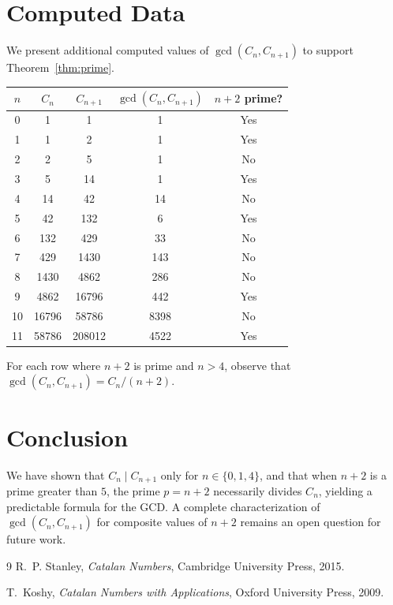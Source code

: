 \documentclass[12pt]{article}
\theoremstyle{definition}
\theoremstyle{remark}
\begin{document}
\section{Computed Data}

We present additional computed values of $\gcd(C_n, C_{n+1})$ to support Theorem~\ref{thm:prime}.

\begin{center}
\begin{tabular}{c|c|c|c|c}
$n$ & $C_n$ & $C_{n+1}$ & $\gcd(C_n, C_{n+1})$ & $n+2$ prime? \\
\hline
0 & 1 & 1 & 1 & Yes \\
1 & 1 & 2 & 1 & Yes \\
2 & 2 & 5 & 1 & No \\
3 & 5 & 14 & 1 & Yes \\
4 & 14 & 42 & 14 & No \\
5 & 42 & 132 & 6 & Yes \\
6 & 132 & 429 & 33 & No \\
7 & 429 & 1430 & 143 & No \\
8 & 1430 & 4862 & 286 & No \\
9 & 4862 & 16796 & 442 & Yes \\
10 & 16796 & 58786 & 8398 & No \\
11 & 58786 & 208012 & 4522 & Yes \\
\end{tabular}
\end{center}

For each row where $n+2$ is prime and $n > 4$, observe that $\gcd(C_n, C_{n+1}) = C_n / (n+2)$.

\section{Conclusion}

We have shown that $C_n \mid C_{n+1}$ only for $n \in \{0, 1, 4\}$, and that when $n + 2$ is a prime greater than $5$, the prime $p = n+2$ necessarily divides $C_n$, yielding a predictable formula for the GCD. A complete characterization of $\gcd(C_n, C_{n+1})$ for composite values of $n+2$ remains an open question for future work.

\begin{thebibliography}{9}
R.~P. Stanley, \textit{Catalan Numbers}, Cambridge University Press, 2015.

T.~Koshy, \textit{Catalan Numbers with Applications}, Oxford University Press, 2009.
\end{thebibliography}
\end{document}
